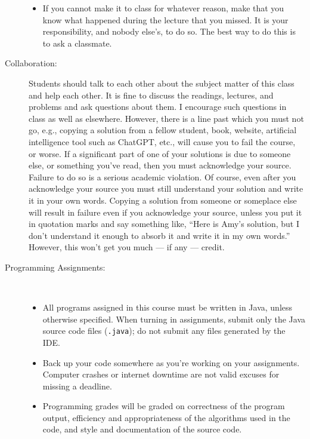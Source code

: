 \documentclass [letterpaper,11pt]{article}
\begin{document}
\begin{description}
\begin{itemize}
	\item  If you cannot make it to class for whatever reason, make that you know
	what happened during the lecture that you missed.  It is your responsibility, and nobody else's,
	to do so.  The best way to do this is to ask a classmate.  	     
     \end{itemize}

\item[Collaboration:]
Students should talk to each other about the subject matter of this class and help each other.  It is fine to discuss the readings, lectures, and problems and ask questions about them. I encourage such questions in class as well as elsewhere. However, there is a line past which you must not go, e.g., copying a solution from a fellow student, book, website, artificial intelligence tool such as ChatGPT, etc., will cause you to fail the course, or worse. If a significant part of one of your solutions is due to someone else, or something you've read, then you must acknowledge your source. Failure to do so is a serious academic violation. Of course, even after you acknowledge your source you must still understand your solution and write it in your own words. Copying a solution from someone or someplace else will result in failure even if you acknowledge your source, unless you put it in quotation marks and say something like, ``Here is Amy's solution, but I don't understand it enough to absorb it and write it in my own words.'' However, this won't get you much --- if any --- credit. 




\item[Programming Assignments:]\

\begin{itemize}\setlength{\itemsep}{0em}\setlength{\parskip}{0pt}
	\item All programs assigned in this course must be written in Java, unless otherwise specified.  When turning in assignments,
	submit only the Java source code files (\texttt{.java}); do not submit any files generated by the IDE.	
			\item Back up your code somewhere as you're working on your assignments.  Computer
		crashes or internet downtime are not valid excuses for missing a deadline.
				

\item Programming grades will be graded on correctness of the program output, efficiency and appropriateness of the algorithms used in the code, and style and documentation of the source code.


\end{itemize}
\end{description}
\end{document}
